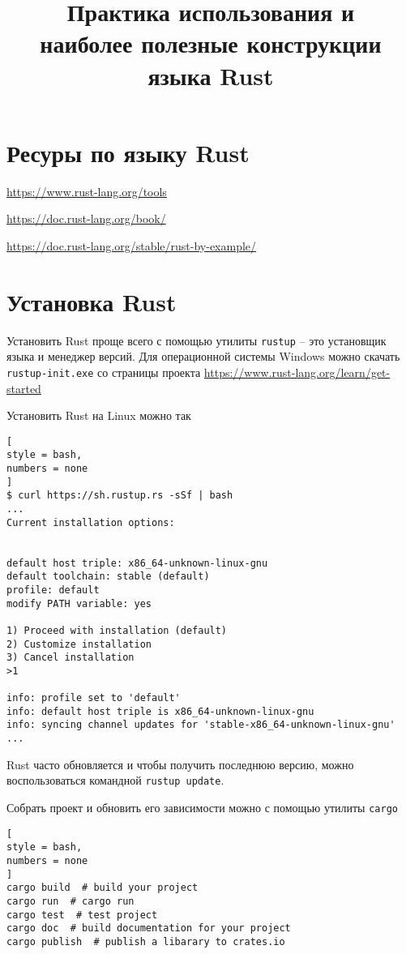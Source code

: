 \documentclass[%
	11pt,
	a4paper,
	utf8,
		]{article}
\begin{document}
\title{Практика использования и \\наиболее полезные конструкции языка Rust}

\author{}

\date{}
\maketitle

\thispagestyle{fancy}

\tableofcontents

\section{Ресуры по языку Rust}

\url{https://www.rust-lang.org/tools}

\url{https://doc.rust-lang.org/book/}

\url{https://doc.rust-lang.org/stable/rust-by-example/}

\section{Установка Rust}

Установить Rust проще всего с помощью утилиты \texttt{rustup} -- это установщик языка и менеджер версий. Для операционной системы Windows можно скачать \texttt{rustup-init.exe} со страницы проекта \url{https://www.rust-lang.org/learn/get-started}

Установить Rust на Linux можно так
\begin{lstlisting}[
style = bash,
numbers = none
]
$ curl https://sh.rustup.rs -sSf | bash
...
Current installation options:


default host triple: x86_64-unknown-linux-gnu
default toolchain: stable (default)
profile: default
modify PATH variable: yes

1) Proceed with installation (default)
2) Customize installation
3) Cancel installation
>1

info: profile set to 'default'
info: default host triple is x86_64-unknown-linux-gnu
info: syncing channel updates for 'stable-x86_64-unknown-linux-gnu'
...
\end{lstlisting}

Rust часто обновляется и чтобы получить последнюю версию, можно воспользоваться командной \texttt{rustup update}.

Собрать проект и обновить его зависимости можно с помощью утилиты \texttt{cargo}
\begin{lstlisting}[
style = bash,
numbers = none
]
cargo build  # build your project
cargo run  # cargo run
cargo test  # test project 
cargo doc  # build documentation for your project
cargo publish  # publish a libarary to crates.io
\end{lstlisting}
\end{document}
